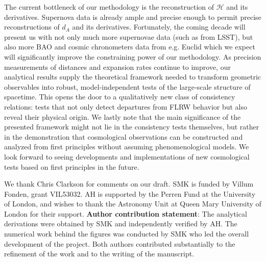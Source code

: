 \documentclass[reprint,aps,prd,nofootinbib,a4paper,10pt,twocolumn,superscriptaddress]{revtex4-2}
\begin{document}
\newline\indent
The current bottleneck of our methodology is the reconstruction of $\mathcal{H}$ and its derivatives. Supernova data is already ample and precise enough to permit precise reconstructions of $d_A$ and its derivatives. Fortunately, the coming decade will present us with not only much more supernovae data (such as from LSST), but also more BAO and cosmic chronometers data from e.g. Euclid which we expect will significantly improve the constraining power of our methodology. As precision measurements of distances and expansion rates continue to improve, our analytical results supply the theoretical framework needed to transform geometric observables into robust, model‑independent tests of the large‑scale structure of spacetime. This opens the door to a qualitatively new class of consistency relations: tests that not only detect departures from FLRW behavior but also reveal their physical origin. We lastly note that the main significance of the presented framework might not lie in the consistency tests themselves, but rather in the demonstration that cosmological observations can be constructed and analyzed from first principles without assuming phenomenological models. We look forward to seeing developments and implementations of new cosmological tests based on first principles in the future.





\begin{acknowledgments}
We thank Chris Clarkson for comments on our draft.
SMK is funded by Villum Fonden, grant VIL53032.
AH is supported by the Perren Fund at the University of London, and wishes to thank the Astronomy Unit at Queen Mary University of London for their support.
{\bf Author contribution statement}: The analytical derivations were obtained by SMK and independently verified by AH. The numerical work behind the figures was conducted by SMK who led the overall development of the project. Both authors contributed substantially to the refinement of the work and to the writing of the manuscript.
\end{acknowledgments}



\end{document}
